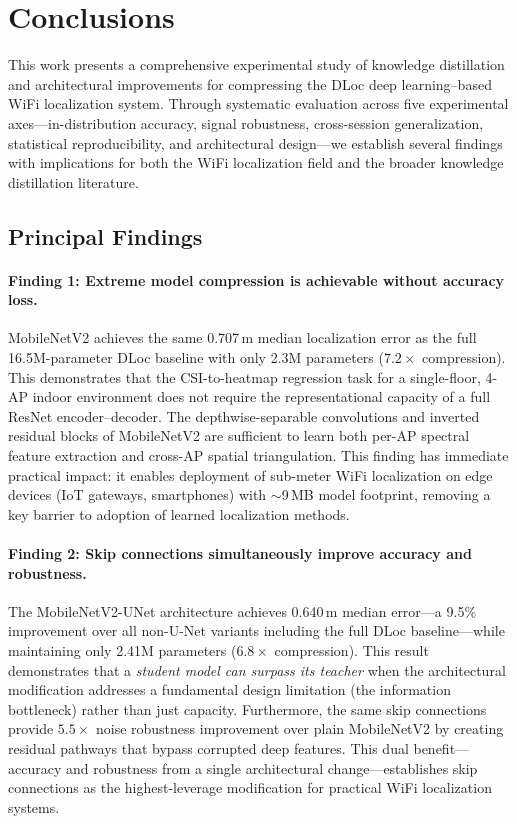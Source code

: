 \documentclass[11pt,a4paper]{article}
\begin{document}
\section{Conclusions}
\label{sec:conclusions}

This work presents a comprehensive experimental study of knowledge distillation and architectural improvements for compressing the DLoc deep learning--based WiFi localization system.
Through systematic evaluation across five experimental axes---in-distribution accuracy, signal robustness, cross-session generalization, statistical reproducibility, and architectural design---we establish several findings with implications for both the WiFi localization field and the broader knowledge distillation literature.

\subsection{Principal Findings}

\paragraph{Finding 1: Extreme model compression is achievable without accuracy loss.}
MobileNetV2 achieves the same 0.707\,m median localization error as the full 16.5M-parameter DLoc baseline with only 2.3M parameters ($7.2\times$ compression).
This demonstrates that the CSI-to-heatmap regression task for a single-floor, 4-AP indoor environment does not require the representational capacity of a full ResNet encoder--decoder.
The depthwise-separable convolutions and inverted residual blocks of MobileNetV2 are sufficient to learn both per-AP spectral feature extraction and cross-AP spatial triangulation.
This finding has immediate practical impact: it enables deployment of sub-meter WiFi localization on edge devices (IoT gateways, smartphones) with $\sim$9\,MB model footprint, removing a key barrier to adoption of learned localization methods.

\paragraph{Finding 2: Skip connections simultaneously improve accuracy and robustness.}
The MobileNetV2-UNet architecture achieves 0.640\,m median error---a 9.5\% improvement over all non-U-Net variants including the full DLoc baseline---while maintaining only 2.41M parameters ($6.8\times$ compression).
This result demonstrates that a \emph{student model can surpass its teacher} when the architectural modification addresses a fundamental design limitation (the information bottleneck) rather than just capacity.
Furthermore, the same skip connections provide $5.5\times$ noise robustness improvement over plain MobileNetV2 by creating residual pathways that bypass corrupted deep features.
This dual benefit---accuracy and robustness from a single architectural change---establishes skip connections as the highest-leverage modification for practical WiFi localization systems.
\end{document}
